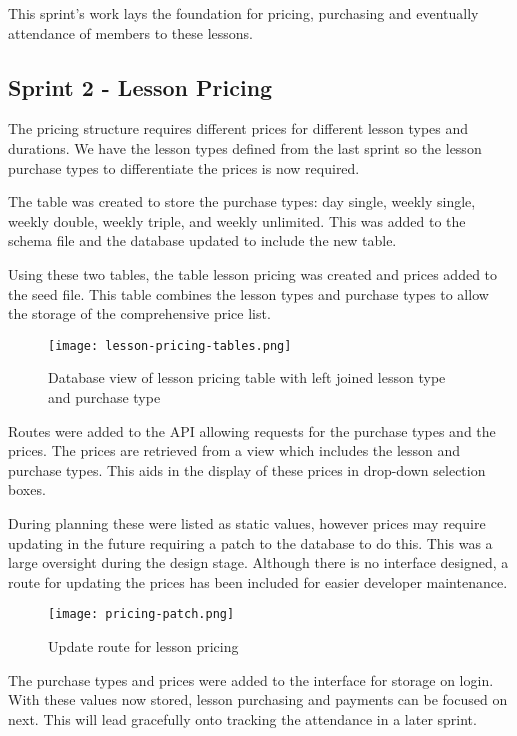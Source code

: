 This sprint's work lays the foundation for pricing, purchasing and eventually attendance of members to these lessons.


\subsection{Sprint 2 - Lesson Pricing}
The pricing structure requires different prices for different lesson types and durations. We have the lesson types defined from the last sprint so the lesson purchase types to differentiate the prices is now required.

The table was created to store the purchase types: day single, weekly single, weekly double, weekly triple, and weekly unlimited. This was added to the schema file and the database updated to include the new table.

Using these two tables, the table lesson pricing was created and prices added to the seed file. This table combines the lesson types and purchase types to allow the storage of the comprehensive price list.

\begin{figure}[ht!]
    \centerline{\texttt{[image: lesson-pricing-tables.png]}}
    \caption{Database view of lesson pricing table with left joined lesson type and purchase type}
    \label{fig:lesson-price-view}
\end{figure}

Routes were added to the API allowing requests for the purchase types and the prices. The prices are retrieved from a view which includes the lesson and purchase types. This aids in the display of these prices in drop-down selection boxes.

During planning these were listed as static values, however prices may require updating in the future requiring a patch to the database to do this. This was a large oversight during the design stage. Although there is no interface designed, a route for updating the prices has been included for easier developer maintenance.

\begin{figure}[ht!]
    \centerline{\texttt{[image: pricing-patch.png]}}
    \caption{Update route for lesson pricing}
    \label{fig:pricing-patch-router}
\end{figure}

The purchase types and prices were added to the interface for storage on login. With these values now stored, lesson purchasing and payments can be focused on next. This will lead gracefully onto tracking the attendance in a later sprint.


